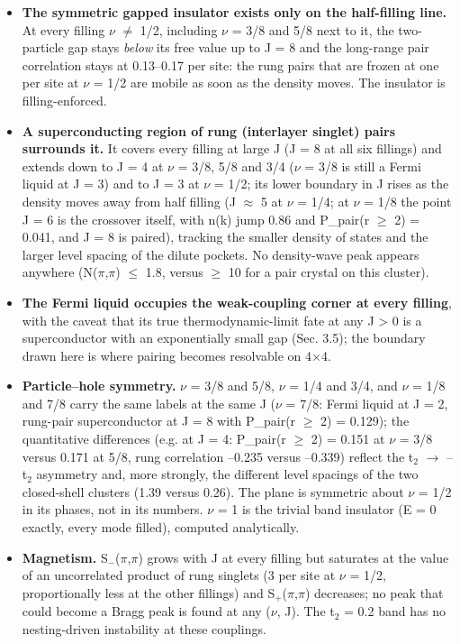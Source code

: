 \documentclass[10pt]{article}
\begin{document}
\begin{itemize}
\item \textbf{The symmetric gapped insulator exists only on the half-filling line.} At every filling $\nu$ $\ne$ 1/2, including
$\nu$ = 3/8 and 5/8 next to it, the two-particle gap stays \emph{below} its free value up to J = 8 and the long-range
pair correlation stays at 0.13--0.17 per site: the rung pairs that are frozen at one per site at $\nu$ = 1/2 are
mobile as soon as the density moves. The insulator is filling-enforced.
\item \textbf{A superconducting region of rung (interlayer singlet) pairs surrounds it.} It covers every filling at large
J (J = 8 at all six fillings) and extends down to J = 4 at $\nu$ = 3/8, 5/8 and 3/4 ($\nu$ = 3/8 is still a Fermi
liquid at J = 3) and to J = 3 at $\nu$ = 1/2; its lower boundary in J rises as the density moves away from half
filling (J $\approx$ 5 at $\nu$ = 1/4; at $\nu$ = 1/8 the point J = 6 is the crossover itself, with n(k) jump 0.86 and
P\_pair(r $\ge$ 2) = 0.041, and J = 8 is paired), tracking the smaller density of states and the larger level
spacing of the dilute pockets. No
density-wave peak appears anywhere (N($\pi$,$\pi$) $\le$ 1.8, versus $\ge$ 10 for a pair crystal on this cluster).
\item \textbf{The Fermi liquid occupies the weak-coupling corner at every filling}, with the caveat that its true
thermodynamic-limit fate at any J > 0 is a superconductor with an exponentially small gap (Sec. 3.5); the
boundary drawn here is where pairing becomes resolvable on 4$\times$4.
\item \textbf{Particle--hole symmetry.} $\nu$ = 3/8 and 5/8, $\nu$ = 1/4 and 3/4, and $\nu$ = 1/8 and 7/8 carry the same labels at the
same J ($\nu$ = 7/8: Fermi liquid at J = 2, rung-pair superconductor at J = 8 with P\_pair(r $\ge$ 2) = 0.129); the
quantitative differences (e.g. at J = 4: P\_pair(r $\ge$ 2) = 0.151 at $\nu$ = 3/8 versus 0.171 at 5/8, rung correlation
--0.235 versus --0.339) reflect the t$_2$ $\to$ --t$_2$ asymmetry and, more strongly, the different level spacings of the
two closed-shell clusters (1.39 versus 0.26). The plane is symmetric about $\nu$ = 1/2 in its phases, not in its
numbers. $\nu$ = 1 is the trivial band insulator (E = 0 exactly, every mode filled), computed analytically.
\item \textbf{Magnetism.} S$_-$($\pi$,$\pi$) grows with J at every filling but saturates at the value of an uncorrelated product
of rung singlets (3 per site at $\nu$ = 1/2, proportionally less at the other fillings) and S$_+$($\pi$,$\pi$) decreases; no
peak that could become a Bragg peak is found at any ($\nu$, J). The t$_2$ = 0.2 band has no nesting-driven instability at these
couplings.
\end{itemize}
\end{document}
